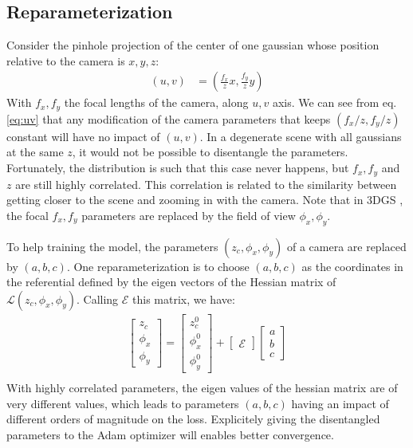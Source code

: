 \documentclass{article}
\begin{document}
\subsection{Reparameterization} \label{abc}
Consider the pinhole projection of the center of one gaussian whose position relative to the camera is $x,y,z$:
\begin{align}
	\label{eq:uv}
	(u, v) &= (\frac{f_x}{z} x, \frac{f_y}{z} y)
\end{align}
With $f_x,f_y$ the focal lengths of the camera, along $u,v$ axis.
We can see from eq. \ref{eq:uv} that any modification of the camera parameters that keeps $(f_x / z, f_y / z)$ constant will have no
impact of $(u,v)$. In a degenerate scene with all gaussians at the same $z$, it would not be possible to disentangle the parameters.
Fortunately, the distribution is such that this case never happens, but $f_x, f_y$ and $z$ are still highly correlated.
This correlation is related to the similarity between getting closer to the scene and zooming in with the camera. Note that in
3DGS \cite{kerbl20233d}, the focal $f_x, f_y$ parameters are replaced by the field of view $\phi_x,\phi_y$.

To help training the model, the parameters $(z_c, \phi_x, \phi_y)$ of a camera are replaced by $(a, b, c)$.
One reparameterization is to choose $(a, b, c)$ as the coordinates in the referential defined by the eigen vectors of
the Hessian matrix of $\mathcal{L}(z_c,\phi_x,\phi_y)$. Calling $\mathcal{E}$ this matrix, we have:
\begin{align}
	\label{eq:abc}
	\begin{bmatrix}z_c\\\phi_x\\\phi_y\end{bmatrix} = \begin{bmatrix}z_{c}^0\\\phi_x^0\\\phi_y^0\end{bmatrix} + \begin{bmatrix}\mathcal{E}\end{bmatrix} \begin{bmatrix}a\\b\\c\end{bmatrix} \\
\end{align}
With highly correlated parameters, the eigen values of the hessian matrix are of very different values, which leads to parameters
$(a,b,c)$ having an impact of different orders of magnitude on the loss. Explicitely giving the disentangled parameters to the Adam optimizer
will enables better convergence.
\end{document}

